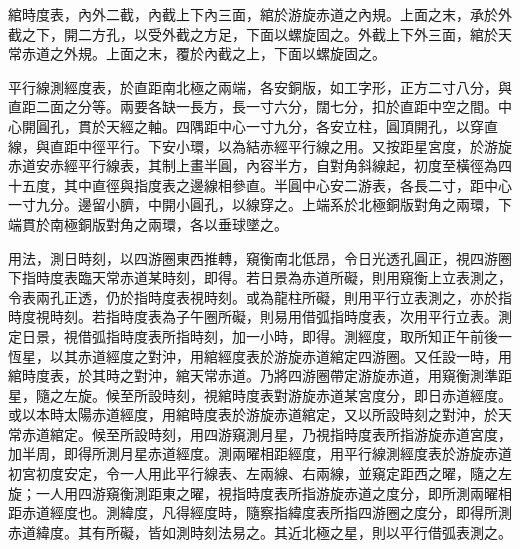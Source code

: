 \begin{pinyinscope}
綰時度表，內外二截，內截上下內三面，綰於游旋赤道之內規。上面之末，承於外截之下，開二方孔，以受外截之方足，下面以螺旋固之。外截上下外三面，綰於天常赤道之外規。上面之末，覆於內截之上，下面以螺旋固之。

平行線測經度表，於直距南北極之兩端，各安銅版，如工字形，正方二寸八分，與直距二面之分等。兩要各缺一長方，長一寸六分，闊七分，扣於直距中空之間。中心開圓孔，貫於天經之軸。四隅距中心一寸九分，各安立柱，圓頂開孔，以穿直線，與直距中徑平行。下安小環，以為結赤經平行線之用。又按距星宮度，於游旋赤道安赤經平行線表，其制上畫半圓，內容半方，自對角斜線起，初度至橫徑為四十五度，其中直徑與指度表之邊線相參直。半圓中心安二游表，各長二寸，距中心一寸九分。邊留小臍，中開小圓孔，以線穿之。上端系於北極銅版對角之兩環，下端貫於南極銅版對角之兩環，各以垂球墜之。

用法，測日時刻，以四游圈東西推轉，窺衡南北低昂，令日光透孔圓正，視四游圈下指時度表臨天常赤道某時刻，即得。若日景為赤道所礙，則用窺衡上立表測之，令表兩孔正透，仍於指時度表視時刻。或為龍柱所礙，則用平行立表測之，亦於指時度視時刻。若指時度表為子午圈所礙，則易用借弧指時度表，次用平行立表。測定日景，視借弧指時度表所指時刻，加一小時，即得。測經度，取所知正午前後一恆星，以其赤道經度之對沖，用綰經度表於游旋赤道綰定四游圈。又任設一時，用綰時度表，於其時之對沖，綰天常赤道。乃將四游圈帶定游旋赤道，用窺衡測準距星，隨之左旋。候至所設時刻，視綰時度表對游旋赤道某宮度分，即日赤道經度。或以本時太陽赤道經度，用綰時度表於游旋赤道綰定，又以所設時刻之對沖，於天常赤道綰定。候至所設時刻，用四游窺測月星，乃視指時度表所指游旋赤道宮度，加半周，即得所測月星赤道經度。測兩曜相距經度，用平行線測經度表於游旋赤道初宮初度安定，令一人用此平行線表、左兩線、右兩線，並窺定距西之曜，隨之左旋；一人用四游窺衡測距東之曜，視指時度表所指游旋赤道之度分，即所測兩曜相距赤道經度也。測緯度，凡得經度時，隨察指緯度表所指四游圈之度分，即得所測赤道緯度。其有所礙，皆如測時刻法易之。其近北極之星，則以平行借弧表測之。


\end{pinyinscope}